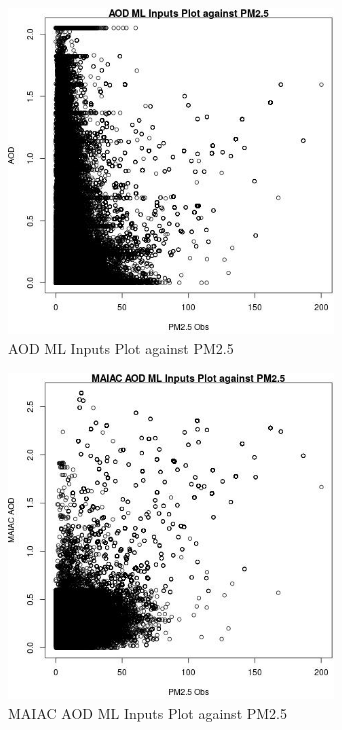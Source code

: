\begin{figure} 
\centering  
\includegraphics[width=0.77\textwidth]{Code_Outputs/ML_input_report_ML_input_PM25_Step5_part_d_de_duplicated_aves_ML_input_AODvPM25_Obs.jpg} 
\caption{\label{fig:ML_input_report_ML_input_PM25_Step5_part_d_de_duplicated_aves_ML_inputAODvPM25_Obs}AOD ML Inputs Plot against PM2.5} 
\end{figure} 
 

\begin{figure} 
\centering  
\includegraphics[width=0.77\textwidth]{Code_Outputs/ML_input_report_ML_input_PM25_Step5_part_d_de_duplicated_aves_ML_input_MAIAC_AODvPM25_Obs.jpg} 
\caption{\label{fig:ML_input_report_ML_input_PM25_Step5_part_d_de_duplicated_aves_ML_inputMAIAC_AODvPM25_Obs}MAIAC AOD ML Inputs Plot against PM2.5} 
\end{figure} 
 

